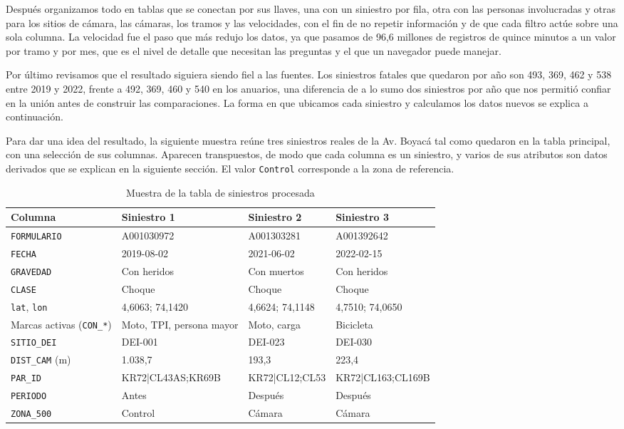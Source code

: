 \documentclass[10pt,a4paper]{article}
\begin{document}
Después organizamos todo en tablas que se conectan por sus llaves, una con un siniestro por fila, otra con las personas involucradas y otras para los sitios de cámara, las cámaras, los tramos y las velocidades, con el fin de no repetir información y de que cada filtro actúe sobre una sola columna. La velocidad fue el paso que más redujo los datos, ya que pasamos de 96,6 millones de registros de quince minutos a un valor por tramo y por mes, que es el nivel de detalle que necesitan las preguntas y el que un navegador puede manejar.

Por último revisamos que el resultado siguiera siendo fiel a las fuentes. Los siniestros fatales que quedaron por año son 493, 369, 462 y 538 entre 2019 y 2022, frente a 492, 369, 460 y 540 en los anuarios, una diferencia de a lo sumo dos siniestros por año que nos permitió confiar en la unión antes de construir las comparaciones. La forma en que ubicamos cada siniestro y calculamos los datos nuevos se explica a continuación.

Para dar una idea del resultado, la siguiente muestra reúne tres siniestros reales de la Av. Boyacá tal como quedaron en la tabla principal, con una selección de sus columnas. Aparecen transpuestos, de modo que cada columna es un siniestro, y varios de sus atributos son datos derivados que se explican en la siguiente sección. El valor \texttt{Control} corresponde a la zona de referencia.

\begin{table}[H]\centering\small
\begin{tabular}{llll}
\toprule
\textbf{Columna} & \textbf{Siniestro 1} & \textbf{Siniestro 2} & \textbf{Siniestro 3}\\
\midrule
\texttt{FORMULARIO} & A001030972 & A001303281 & A001392642\\
\texttt{FECHA} & 2019-08-02 & 2021-06-02 & 2022-02-15\\
\texttt{GRAVEDAD} & Con heridos & Con muertos & Con heridos\\
\texttt{CLASE} & Choque & Choque & Choque\\
\texttt{lat}, \texttt{lon} & 4,6063; \textminus{}74,1420 & 4,6624; \textminus{}74,1148 & 4,7510; \textminus{}74,0650\\
Marcas activas (\texttt{CON\_*}) & Moto, TPI, persona mayor & Moto, carga & Bicicleta\\
\texttt{SITIO\_DEI} & DEI-001 & DEI-023 & DEI-030\\
\texttt{DIST\_CAM} (m) & 1.038,7 & 193,3 & 223,4\\
\texttt{PAR\_ID} & KR72|CL43AS;KR69B & KR72|CL12;CL53 & KR72|CL163;CL169B\\
\texttt{PERIODO} & Antes & Después & Después\\
\texttt{ZONA\_500} & Control & Cámara & Cámara\\
\bottomrule
\end{tabular}
\caption{Muestra de la tabla de siniestros procesada}
\end{table}
\end{document}
